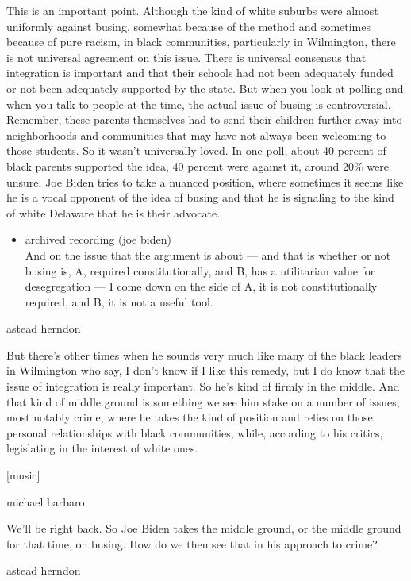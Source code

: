 This is an important point. Although the kind of white suburbs were
almost uniformly against busing, somewhat because of the method and
sometimes because of pure racism, in black communities, particularly in
Wilmington, there is not universal agreement on this issue. There is
universal consensus that integration is important and that their schools
had not been adequately funded or not been adequately supported by the
state. But when you look at polling and when you talk to people at the
time, the actual issue of busing is controversial. Remember, these
parents themselves had to send their children further away into
neighborhoods and communities that may have not always been welcoming to
those students. So it wasn't universally loved. In one poll, about 40
percent of black parents supported the idea, 40 percent were against it,
around 20\% were unsure. Joe Biden tries to take a nuanced position,
where sometimes it seems like he is a vocal opponent of the idea of
busing and that he is signaling to the kind of white Delaware that he is
their advocate.

\begin{itemize}
\tightlist
\item
  archived recording (joe biden)\\
  And on the issue that the argument is about --- and that is whether or
  not busing is, A, required constitutionally, and B, has a utilitarian
  value for desegregation --- I come down on the side of A, it is not
  constitutionally required, and B, it is not a useful tool.
\end{itemize}

astead herndon

But there's other times when he sounds very much like many of the black
leaders in Wilmington who say, I don't know if I like this remedy, but I
do know that the issue of integration is really important. So he's kind
of firmly in the middle. And that kind of middle ground is something we
see him stake on a number of issues, most notably crime, where he takes
the kind of position and relies on those personal relationships with
black communities, while, according to his critics, legislating in the
interest of white ones.

{[}music{]}

michael barbaro

We'll be right back. So Joe Biden takes the middle ground, or the middle
ground for that time, on busing. How do we then see that in his approach
to crime?

astead herndon

